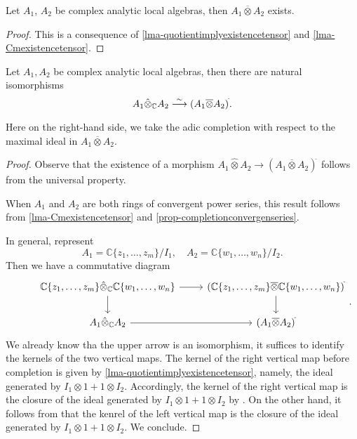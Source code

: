 \begin{corollary}
    Let $A_1$, $A_2$ be complex analytic local algebras, then $A_1\overline{\otimes} A_2$ exists. 
\end{corollary}
\begin{proof}
    This is a consequence of \cref{lma-quotientimplyexistencetensor} and \cref{lma-Cmexistencetensor}.
\end{proof}

\begin{thm}
    Let $A_1,A_2$ be complex analytic local algebras, then there are natural isomorphisms
    \[
      A_1\hat{\otimes}_{\mathbb{C}} A_2 \stackrel{\sim}{\longrightarrow}  (A_1\overline{\otimes} A_2)^{\hat{}}.
    \]
\end{thm}
Here on the right-hand side, we take the adic completion with respect to the maximal ideal in $A_1\overline{\otimes} A_2$.
\begin{proof}
    Observe that the existence of a morphism $A_1\hat{\otimes} A_2 \rightarrow  (A_1\overline{\otimes} A_2)^{\hat{}}$ follows from the universal property.

    When $A_1$ and $A_2$ are both rings of convergent power series, this result follows from \cref{lma-Cmexistencetensor} and \cref{prop-completionconvergenseries}. 

    In general, represent 
    \[
        A_1=\mathbb{C}\{ z_1,\ldots,z_m\}/I_1,\quad   A_2=\mathbb{C}\{ w_1,\ldots,w_n\}/I_2.
    \]
    Then we have a commutative diagram
    \[ 
    \begin{tikzcd}
        & \mathbb{C}\{ z_1,\ldots,z_m\} \hat{\otimes}_{\mathbb{C}}  \mathbb{C}\{ w_1,\ldots,w_n\} \arrow[r]\arrow[d] & (\mathbb{C}\{ z_1,\ldots,z_m\}\overline{\otimes} \mathbb{C}\{ w_1,\ldots,w_n\})^{\hat{}} \arrow[d]\\
        & A_1\hat{\otimes}_{\mathbb{C}} A_2 \arrow[r] & (A_1\overline{\otimes} A_2)^{\hat{}}
    \end{tikzcd}.
    \]
    We already know tha the upper arrow is an isomorphism, it suffices to identify the kernels of the two vertical maps. The kernel of the right vertical map before completion is given by \cref{lma-quotientimplyexistencetensor}, namely, the ideal generated by $I_1\otimes 1+1\otimes I_2$. Accordingly, the kernel of the right vertical map is the closure of the ideal generated by $I_1\otimes 1+1\otimes I_2$ by \cite[\href{https://stacks.math.columbia.edu/tag/0ARZ}{Tag 0ARZ}]{stacks-project}. On the other hand, it follows from \cite[\href{https://stacks.math.columbia.edu/tag/0ARZ}{Tag 0ARZ}]{stacks-project} that the kenrel of the left vertical map is the closure of the ideal generated by $I_1\otimes 1+1\otimes I_2$. We conclude.
\end{proof}

